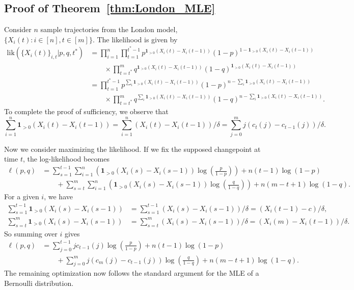 \documentclass[12pt]{article}
\theoremstyle{definition}
\begin{document}
\subsection{Proof of Theorem~\ref{thm:London_MLE}}

Consider $n$ sample trajectories from the London model, $\{X_i(t):i\in[n], t\in[m]\}$. The likelihood is given by
\begin{align*}
    \mathrm{lik}(\{X_i(t)\}_{i,t}|p,q,t^*) &=\prod_{i=1}^n\prod_{t=1}^{t^*-1}p^{\mathbf{1}_{>0}(X_i(t)-X_i(t-1))}(1-p)^{1-\mathbf{1}_{>0}(X_i(t)-X_i(t-1))}\\
    &\qquad \times\prod_{t=t^*}^m q^{\mathbf{1}_{>0}(X_i(t)-X_i(t-1))}(1-q)^{\mathbf{1}_{>0}(X_i(t)-X_i(t-1))}\\
    &=\prod_{t=1}^{t^*-1}p^{\sum_i \mathbf{1}_{>0}(X_i(t)-X_{i}(t-1))}(1-p)^{n-\sum_i \mathbf{1}_{>0}(X_i(t)-X_i(t-1))}\\
    &\qquad\times\prod_{t=t^*}^m q^{\sum_i \mathbf{1}_{>0}(X_i(t)-X_i(t-1))}(1-q)^{n-\sum_i \mathbf{1}_{>0}(X_i(t)-X_i(t-1))}.
\end{align*}
To complete the proof of sufficiency, we observe that
$$\sum_{i=1}^n \mathbf{1}_{>0}(X_i(t)-X_i(t-1))=\sum_{i=1}^n (X_i(t)-X_i(t-1))/\delta=\sum_{j=0}^m j(c_t(j)-c_{t-1}(j))/\delta.$$

Now we consider maximizing the likelihood. If we fix the supposed changepoint at time $t$, the log-likelihood becomes
\begin{align*}
\ell(p,q)&= \sum_{s=1}^{t-1} \sum_{i=1}^n \left(\mathbf{1}_{>0}(X_i(s)-X_i(s-1))\log\left(\frac{p}{1-p}\right)\right)+n(t-1)\log(1-p)\\
&\qquad +\sum_{s=t}^m \sum_{i=1}^n\left(\mathbf{1}_{>0}(X_i(s)-X_i(s-1))\log\left(\frac{q}{1-q}\right)\right)+n(m-t+1)\log(1-q).
\end{align*}
For a given $i$, we have
\begin{align*}
\sum_{s=1}^{t-1}\mathbf{1}_{>0}(X_i(s)-X_i(s-1))&=\sum_{s=1}^{t-1}(X_i(s)-X_i(s-1))/\delta=(X_i(t-1)-c)/\delta,\\
\sum_{s=t}^m \mathbf{1}_{>0}(X_i(s)-X_i(s-1))&=\sum_{s=t}^m (X_i(s)-X_i(s-1))/\delta=(X_i(m)-X_i(t-1))/\delta.
\end{align*}
So summing over $i$ gives
\begin{align*}
\ell(p,q)&= \sum_{j=0}^{t-1}jc_{t-1}(j)\log\left(\frac{p}{1-p}\right)+n(t-1)\log(1-p)\\
&\qquad +\sum_{j=0}^m j(c_m(j)-c_{t-1}(j))\log\left(\frac{q}{1-q}\right)+n(m-t+1)\log(1-q).
\end{align*}
The remaining optimization now follows the standard argument for the MLE of a Bernoulli distribution.
\end{document}
